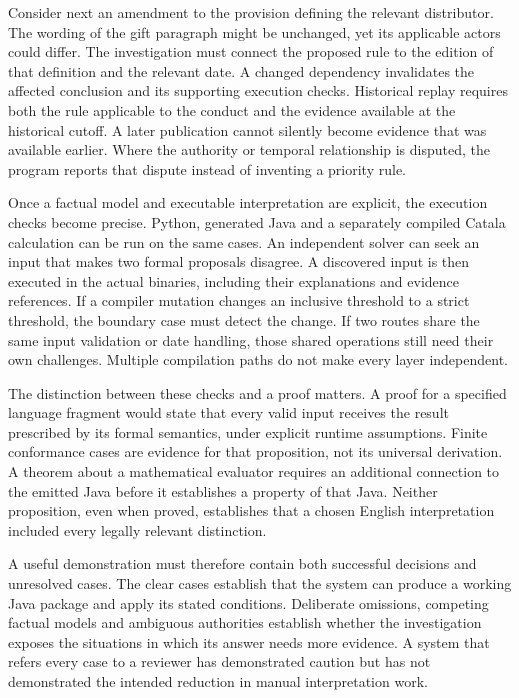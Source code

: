 Consider next an amendment to the provision defining the relevant distributor.
The wording of the gift paragraph might be unchanged, yet its applicable actors
could differ. The investigation must connect the proposed rule to the edition
of that definition and the relevant date. A changed dependency invalidates the
affected conclusion and its supporting execution checks. Historical replay
requires both the rule applicable to the conduct and the evidence available at
the historical cutoff. A later publication cannot silently become evidence that
was available earlier. Where the authority or temporal relationship is disputed,
the program reports that dispute instead of inventing a priority rule.

Once a factual model and executable interpretation are explicit, the execution
checks become precise. Python, generated Java and a separately compiled Catala
calculation can be run on the same cases. An independent solver can seek an
input that makes two formal proposals disagree. A discovered input is then
executed in the actual binaries, including their explanations and evidence
references. If a compiler mutation changes an inclusive threshold to a strict
threshold, the boundary case must detect the change. If two routes share the
same input validation or date handling, those shared operations still need
their own challenges. Multiple compilation paths do not make every layer
independent.

The distinction between these checks and a proof matters. A proof for a
specified language fragment would state that every valid input receives the
result prescribed by its formal semantics, under explicit runtime assumptions.
Finite conformance cases are evidence for that proposition, not its universal
derivation. A theorem about a mathematical evaluator requires an additional
connection to the emitted Java before it establishes a property of that Java.
Neither proposition, even when proved, establishes that a chosen English
interpretation included every legally relevant distinction.

A useful demonstration must therefore contain both successful decisions and
unresolved cases. The clear cases establish that the system can produce a
working Java package and apply its stated conditions. Deliberate omissions,
competing factual models and ambiguous authorities establish whether the
investigation exposes the situations in which its answer needs more evidence.
A system that refers every case to a reviewer has demonstrated caution but
has not demonstrated the intended reduction in manual interpretation work.

